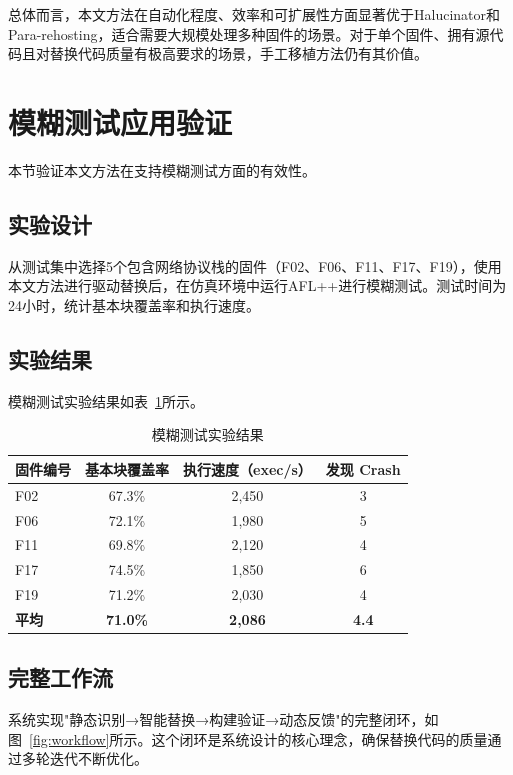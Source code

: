 总体而言，本文方法在自动化程度、效率和可扩展性方面显著优于Halucinator和Para-rehosting，适合需要大规模处理多种固件的场景。对于单个固件、拥有源代码且对替换代码质量有极高要求的场景，手工移植方法仍有其价值。

\section{模糊测试应用验证}
\label{sec:fuzz_eval}

本节验证本文方法在支持模糊测试方面的有效性。

\subsection{实验设计}

从测试集中选择5个包含网络协议栈的固件（F02、F06、F11、F17、F19），使用本文方法进行驱动替换后，在仿真环境中运行AFL++进行模糊测试。测试时间为24小时，统计基本块覆盖率和执行速度。

\subsection{实验结果}

模糊测试实验结果如表~\ref{tab:fuzz_results}所示。

\begin{table}[htbp]
\centering
\caption{模糊测试实验结果}
\label{tab:fuzz_results}
\begin{tabular}{lccc}
\toprule
\textbf{固件编号} & \textbf{基本块覆盖率} & \textbf{执行速度（exec/s）} & \textbf{发现 Crash} \\
\midrule
F02 & 67.3\% & 2,450 & 3 \\
F06 & 72.1\% & 1,980 & 5 \\
F11 & 69.8\% & 2,120 & 4 \\
F17 & 74.5\% & 1,850 & 6 \\
F19 & 71.2\% & 2,030 & 4 \\
\midrule
\textbf{平均} & \textbf{71.0\%} & \textbf{2,086} & \textbf{4.4} \\
\bottomrule
\end{tabular}
\end{table}

\subsection{完整工作流}

系统实现"静态识别→智能替换→构建验证→动态反馈"的完整闭环，如图~\ref{fig:workflow}所示。这个闭环是系统设计的核心理念，确保替换代码的质量通过多轮迭代不断优化。

